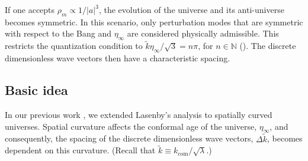 If one accepts $\rho_m \propto 1/|a|^3$, the evolution of the universe and its anti-universe becomes symmetric. In this scenario, only perturbation modes that are symmetric with respect to the Bang and $\eta_\infty$ are considered physically admissible. %
This restricts the quantization condition to $\tilde k\eta_\infty/\sqrt{3}=n\pi$, for $n \in \mathbb{N}$ (\cite{2022PhRvD.105h3515B}). %
The discrete dimensionless wave vectors then have a characteristic spacing. %

\subsection{Basic idea}

In our previous work \cite{PhysRevD.110.103528}, we extended Lasenby's analysis \cite{2022PhRvD.105h3514L} to spatially curved universes. %
Spatial curvature affects the conformal age of the universe, $\eta_\infty$, and consequently, the spacing of the discrete dimensionless wave vectors, $\Delta \tilde k$, becomes dependent on this curvature. (Recall that $\tilde k \equiv k_{\mathrm{com}}/\sqrt{\lambda}$.) %

